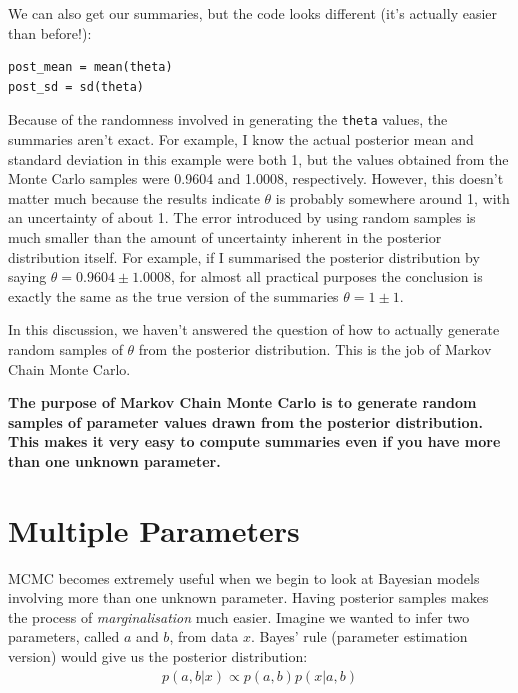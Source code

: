 We can also get our summaries, but the code looks different
(it's actually easier than before!):
\begin{verbatim}
post_mean = mean(theta)
post_sd = sd(theta)
\end{verbatim}
Because of the randomness involved in generating the {\tt theta} values,
the summaries aren't exact. For example, I know the actual posterior mean
and standard deviation in this example were both 1, but the values obtained
from the Monte Carlo samples were 0.9604 and 1.0008, respectively. However,
this doesn't matter much because the results indicate $\theta$ is probably
somewhere around 1, with an uncertainty of about 1. The error introduced by
using random samples is much smaller than the amount of uncertainty inherent
in the posterior distribution itself. For example, if I summarised the posterior
distribution by saying $\theta = 0.9604 \pm 1.0008$, for almost all practical
purposes the conclusion is exactly the same as the true version of the summaries
$\theta = 1 \pm 1$.

In this discussion, we haven't answered the question of how to actually generate
random samples of $\theta$ from the posterior distribution. This is the job
of Markov Chain Monte Carlo.

\begin{framed}
{\bf
The purpose of Markov Chain Monte Carlo is to generate random samples of
parameter values drawn from the posterior distribution. This makes it very easy
to compute summaries even if you have more than one unknown parameter.}
\end{framed}

\section{Multiple Parameters}
MCMC becomes extremely useful when we begin to look at Bayesian models involving
more than one unknown parameter. 
Having posterior samples makes the process of {\it marginalisation}
much easier. Imagine we wanted to infer two parameters, called $a$ and $b$,
from
data $x$. Bayes' rule (parameter estimation version) would give us the posterior
distribution:
\begin{eqnarray}
p(a, b | x) \propto p(a, b)p(x|a,b)
\end{eqnarray}

